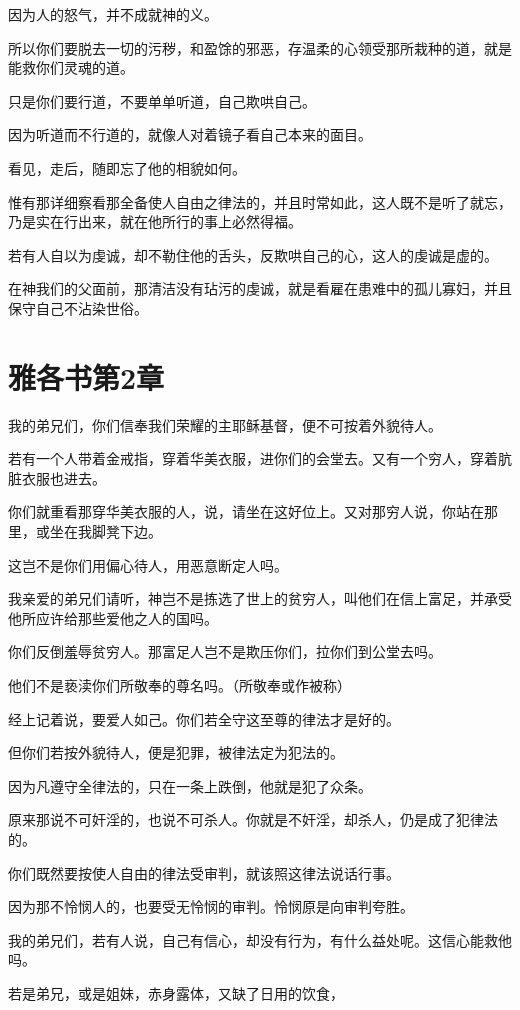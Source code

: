 \documentclass[12pt,oneside]{book}
\begin{document}
因为人的怒气，并不成就神的义。

所以你们要脱去一切的污秽，和盈馀的邪恶，存温柔的心领受那所栽种的道，就是能救你们灵魂的道。

只是你们要行道，不要单单听道，自己欺哄自己。

因为听道而不行道的，就像人对着镜子看自己本来的面目。

看见，走后，随即忘了他的相貌如何。

惟有那详细察看那全备使人自由之律法的，并且时常如此，这人既不是听了就忘，乃是实在行出来，就在他所行的事上必然得福。

若有人自以为虔诚，却不勒住他的舌头，反欺哄自己的心，这人的虔诚是虚的。

在神我们的父面前，那清洁没有玷污的虔诚，就是看雇在患难中的孤儿寡妇，并且保守自己不沾染世俗。

\chapter{雅各书第2章}
我的弟兄们，你们信奉我们荣耀的主耶稣基督，便不可按着外貌待人。

若有一个人带着金戒指，穿着华美衣服，进你们的会堂去。又有一个穷人，穿着肮脏衣服也进去。

你们就重看那穿华美衣服的人，说，请坐在这好位上。又对那穷人说，你站在那里，或坐在我脚凳下边。

这岂不是你们用偏心待人，用恶意断定人吗。

我亲爱的弟兄们请听，神岂不是拣选了世上的贫穷人，叫他们在信上富足，并承受他所应许给那些爱他之人的国吗。

你们反倒羞辱贫穷人。那富足人岂不是欺压你们，拉你们到公堂去吗。

他们不是亵渎你们所敬奉的尊名吗。（所敬奉或作被称）

经上记着说，要爱人如己。你们若全守这至尊的律法才是好的。

但你们若按外貌待人，便是犯罪，被律法定为犯法的。

因为凡遵守全律法的，只在一条上跌倒，他就是犯了众条。

原来那说不可奸淫的，也说不可杀人。你就是不奸淫，却杀人，仍是成了犯律法的。

你们既然要按使人自由的律法受审判，就该照这律法说话行事。

因为那不怜悯人的，也要受无怜悯的审判。怜悯原是向审判夸胜。

我的弟兄们，若有人说，自己有信心，却没有行为，有什么益处呢。这信心能救他吗。

若是弟兄，或是姐妹，赤身露体，又缺了日用的饮食，
\end{document}
